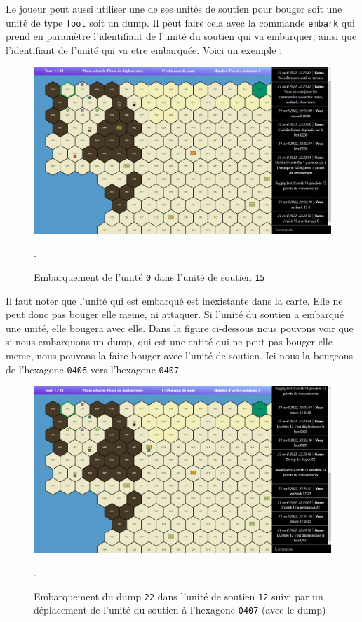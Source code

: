 Le joueur peut aussi utiliser une de ses unités de soutien pour bouger soit une unité de type {\tt foot} soit un dump.
Il peut faire cela avec la commande {\tt embark} qui prend en paramètre l'identifiant de l'unité du soutien qui va embarquer, ainsi que l'identifiant de l'unité qui va etre embarquée. Voici un exemple :\\

\begin{figure}[H]
    \centering
    \includegraphics[scale=0.35]{data/Embark_command.jpg}
    \caption{Embarquement de l'unité \lstinline{0} dans l'unité de soutien  \lstinline{15}}.
\end{figure}

Il faut noter que l'unité qui est embarqué est inexistante dans la carte. Elle ne peut donc pas bouger elle meme, ni attaquer. Si l'unité du soutien a embarqué une unité, elle bougera avec elle. Dans la figure ci-dessous nous pouvons voir que si nous embarquons un dump, qui est une entité qui ne peut pas bouger elle meme, nous pouvons la faire bouger avec l'unité de soutien. Ici nous la bougeons de l'hexagone \lstinline{0406} vers l'hexagone \lstinline{0407} \\

\begin{figure}[H]
    \centering
    \includegraphics[scale=0.35]{data/Embark_dump.jpg}
    \caption{Embarquement du dump \lstinline{22} dans l'unité de soutien  \lstinline{12} suivi par un déplacement de l'unité du soutien à l'hexagone \lstinline{0407} (avec le dump)}.
\end{figure}

